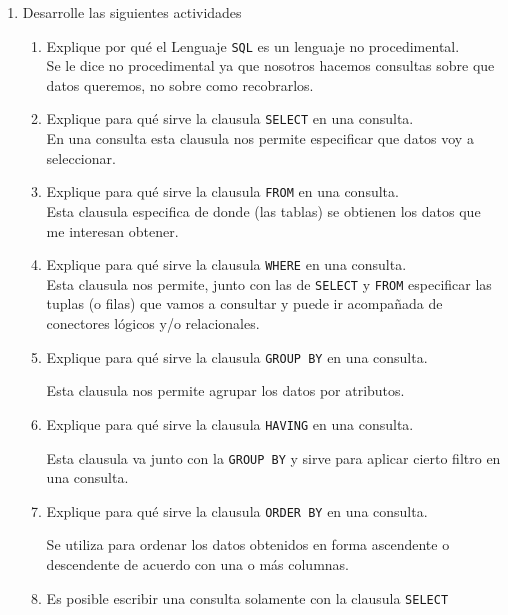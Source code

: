 \begin{enumerate}
\item Desarrolle las siguientes actividades
\begin{enumerate}
\item Explique por qué el Lenguaje \texttt{SQL} es un lenguaje no procedimental. \\
Se le dice no procedimental ya que nosotros hacemos consultas sobre que datos queremos, no sobre como recobrarlos.\\
\item Explique para qué sirve la clausula \texttt{SELECT} en una consulta.\\
En una consulta esta clausula nos permite especificar que datos voy a seleccionar.\\
\item Explique para qué sirve la clausula \texttt{FROM} en una consulta.\\
Esta clausula especifica de donde (las tablas) se obtienen los datos que me interesan obtener.\\
\item Explique para qué sirve la clausula \texttt{WHERE} en una consulta.\\
Esta clausula nos permite, junto con las de \texttt{SELECT} y \texttt{FROM} especificar las tuplas (o filas) que vamos a consultar y puede ir acompañada de conectores lógicos y/o relacionales.\\


\item Explique para qué sirve la clausula \texttt{GROUP BY} en una consulta.

Esta clausula nos permite agrupar los datos por atributos.
\\
\item Explique para qué sirve la clausula \texttt{HAVING} en una consulta.

Esta clausula va junto con la \texttt{GROUP BY} y sirve para aplicar cierto filtro en una consulta.\\

\item Explique para qué sirve la clausula \texttt{ORDER BY} en una consulta.

Se utiliza para  ordenar los datos obtenidos en forma ascendente o descendente de acuerdo con una o más columnas.\\

\item Es posible escribir una consulta solamente con la clausula \texttt{SELECT}


\end{enumerate}
\end{enumerate}
